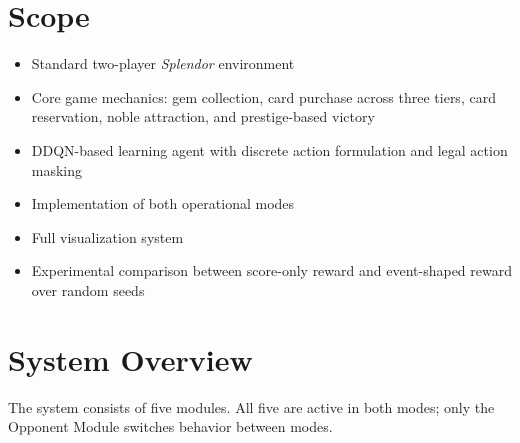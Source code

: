 \documentclass[11pt]{article}
\begin{document}
\section{Scope}

\begin{itemize}
    \item Standard two-player \textit{Splendor} environment
    \item Core game mechanics: gem collection, card purchase across three tiers, card reservation, noble attraction, and prestige-based victory
    \item DDQN-based learning agent with discrete action formulation and legal action masking
    \item Implementation of both operational modes
    \item Full visualization system
    \item Experimental comparison between score-only reward and event-shaped reward over random seeds
\end{itemize}
\section{System Overview}

The system consists of five modules. All five are active in both modes; only the Opponent
Module switches behavior between modes.
\end{document}
